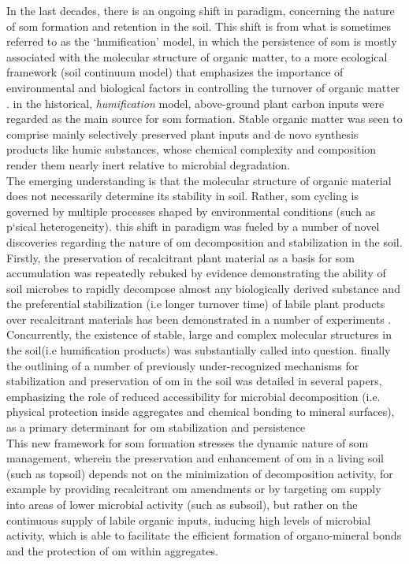 	 In the last  decades, there is an ongoing shift in  paradigm, concerning the nature of \gls{som} formation and retention in the soil. This shift is from what is sometimes referred to as the ‘humification’ model, in which the persistence of \gls{som} is mostly associated with the molecular structure of organic matter, to a more ecological framework (soil continuum model) that emphasizes the importance of environmental and biological factors in controlling the turnover of organic matter \citep{lehmann2015}. in the historical, \textit{humification} model, above-ground plant carbon inputs were regarded as the main source for \gls{som} formation. Stable organic matter was seen to comprise mainly selectively preserved plant inputs and de novo synthesis products like humic substances, whose chemical complexity and composition render them nearly inert relative to microbial degradation.\\
	 The emerging understanding is that the molecular structure of organic material does not necessarily determine its stability in soil. Rather, \gls{som} cycling is governed by multiple processes shaped by environmental conditions (such as p`sical heterogeneity)\citep{schmidt2011c}. this shift in paradigm was fueled by a number of novel discoveries regarding the nature of \gls{om} decomposition and stabilization in the soil. Firstly, the preservation of recalcitrant plant material as a basis for \gls{som} accumulation was repeatedly rebuked by evidence demonstrating the ability of soil microbes to rapidly decompose almost any biologically derived substance \citep{dungait2012, marschner2008} and the preferential stabilization (i.e longer turnover time) of labile plant products over recalcitrant materials has been demonstrated in a number of experiments \citep{cotrufo2013, kleber2011}. Concurrently, the existence of stable, large and complex molecular structures in the soil(i.e humification products) was substantially called into question\citep{kleber2010}. finally the outlining of a number of previously under-recognized mechanisms for stabilization and preservation of \gls{om} in the soil was detailed in several papers, emphasizing the role of reduced accessibility for microbial decomposition (i.e. physical protection inside aggregates and chemical bonding to mineral surfaces), as a primary determinant for \gls{om} stabilization and persistence\citep{lutzow2006, lutzow2008, ekschmitt2008}\.\\
	 This new framework for \gls{som} formation stresses the dynamic nature of \gls{som} management, wherein the preservation and enhancement of \gls{om} in a living soil (such as topsoil) depends not on the minimization of decomposition activity, for example by providing recalcitrant \gls{om} amendments or by targeting \gls{om} supply into areas of lower microbial activity (such as subsoil), but rather on the continuous supply of labile organic inputs, inducing high levels of microbial activity, which is able to facilitate the efficient formation of organo-mineral bonds and the protection of \gls{om} within aggregates\citep{dungait2012,barre2016,basler2015}.

